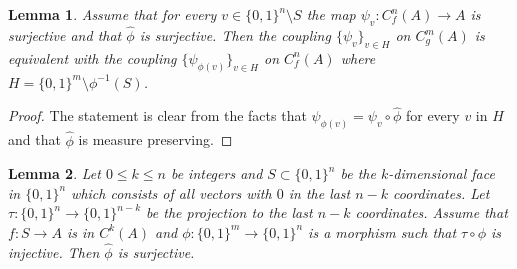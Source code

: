 \documentclass [11pt] {article}
\newtheorem{lemma}{Lemma}[section]
\begin{document}
\begin{lemma}\label{cupis} Assume that for every $v\in\{0,1\}^n\setminus S$ the map $\psi_v:C^n_f(A)\rightarrow A$ is surjective and that $\hat{\phi}$ is surjective. Then the coupling $\{\psi_v\}_{v\in H}$ on $C^m_g(A)$ is equivalent with the coupling $\{\psi_{\phi(v)}\}_{v\in H}$ on $C^n_f(A)$ where $H=\{0,1\}^m\setminus\phi^{-1}(S)$.
\end{lemma}

\begin{proof} The statement is clear from the facts that $\psi_{\phi(v)}=\psi_v\circ\hat{\phi}$ for every $v$ in $H$ and that $\hat{\phi}$ is measure preserving. 
\end{proof}

\begin{lemma}\label{cupis1} Let $0\leq k\leq n$ be integers and $S\subset\{0,1\}^n$ be the $k$-dimensional face in $\{0,1\}^n$ which consists of all vectors with $0$ in the last $n-k$ coordinates. Let $\tau:\{0,1\}^n\rightarrow\{0,1\}^{n-k}$ be the projection to the last $n-k$ coordinates. Assume that $f:S\rightarrow A$ is in $C^k(A)$ and $\phi:\{0,1\}^m\rightarrow\{0,1\}^n$ is a morphism such that $\tau\circ\phi$ is injective. Then $\hat{\phi}$ is surjective.
\end{lemma}
\end{document}
